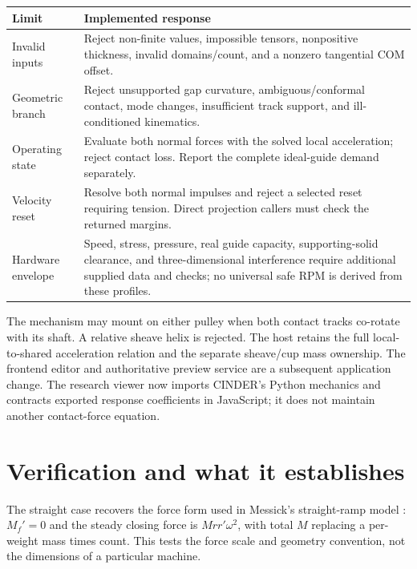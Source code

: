 \documentclass[11pt,letterpaper]{article}
\numberwithin{equation}{section}
\begin{document}
\begin{center}\begin{tabularx}{\textwidth}{@{}p{}Y@{}}
\toprule
Limit & Implemented response\\\midrule
Invalid inputs & Reject non-finite values, impossible tensors, nonpositive thickness,
invalid domains/count, and a nonzero tangential COM offset.\\[.4em]
Geometric branch & Reject unsupported gap curvature, ambiguous/conformal contact,
mode changes, insufficient track support, and ill-conditioned kinematics.\\[.4em]
Operating state & Evaluate both normal forces with the solved local acceleration;
reject contact loss. Report the complete ideal-guide demand separately.\\[.4em]
Velocity reset & Resolve both normal impulses and reject a selected reset requiring
tension. Direct projection callers must check the returned margins.\\[.4em]
Hardware envelope & Speed, stress, pressure, real guide capacity, supporting-solid
clearance, and three-dimensional interference require additional supplied data
and checks; no universal safe RPM is derived from these profiles.\\\bottomrule
\end{tabularx}\end{center}

The mechanism may mount on either pulley when both contact tracks co-rotate
with its shaft. A relative sheave helix is rejected. The host retains the full
local-to-shared acceleration relation and the separate sheave/cup mass
ownership. The frontend editor and authoritative preview service are a
subsequent application change. The research viewer now imports CINDER's Python
mechanics and contracts exported response coefficients in JavaScript; it does
not maintain another contact-force equation.

\section{Verification and what it establishes}

The straight case recovers the force form used in Messick's straight-ramp
model \cite{messick}: $M_f'=0$ and the steady closing force is $Mr r'\omega^2$,
with total $M$ replacing a per-weight mass times count. This tests the force
scale and geometry convention, not the dimensions of a particular machine.
\end{document}
